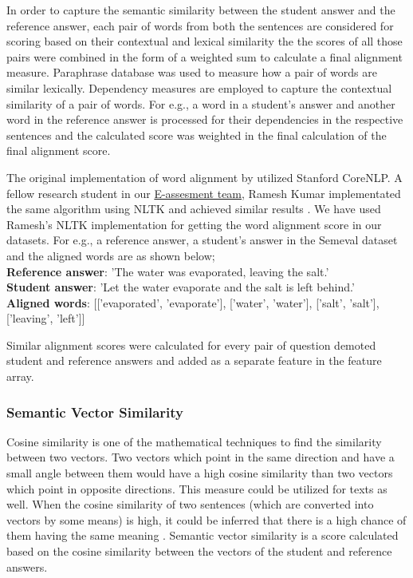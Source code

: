 	In order to capture the semantic similarity between the student answer and the reference answer, each pair of words from both the sentences are considered for scoring based on their contextual and lexical similarity the the scores of all those pairs were combined in the form of a weighted sum to calculate a final alignment measure. Paraphrase database \cite{ganitkevitch2013ppdb} was used to measure how a pair of words are similar lexically. Dependency measures are employed to capture the contextual similarity of a pair of words. For e.g., a word in a student's answer and another word in the reference answer is processed for their dependencies in the respective sentences and the calculated score was weighted in the final calculation of the final alignment score. 
	
	The original implementation of word alignment by \cite{sultan2014back} utilized Stanford CoreNLP. A fellow research student in our \href{https://digiklausur.github.io/}{E-assesment team}, Ramesh Kumar implementated the same algorithm using NLTK and achieved similar results \cite{ramesh2}. We have used Ramesh's NLTK implementation for getting the word alignment score in our datasets. For e.g., a reference answer, a student's answer in the Semeval dataset \cite{nielsen2008annotating} and the aligned words are as shown below; \\ 
	
	
	\noindent \textbf{Reference answer}: 'The water was evaporated, leaving the salt.' \\
	\textbf{Student answer}: 'Let the water evaporate and the salt is left behind.' \\
	\textbf{Aligned words}: [['evaporated', 'evaporate'], ['water', 'water'], ['salt', 'salt'], ['leaving', 'left']]    
	
	Similar alignment scores were calculated for every pair of question demoted student and reference answers and added as a separate feature in the feature array.	
	
	\subsubsection{Semantic Vector Similarity}
	Cosine similarity is one of the mathematical techniques to find the similarity between two vectors. Two vectors which point in the same direction and have a small angle between them would have a high cosine similarity than two vectors which point in opposite directions. This measure could be utilized for texts as well. When the cosine similarity of two sentences (which are converted into vectors by some means) is high, it could be inferred that there is a high chance of them having the same meaning \cite{cos_sim}. Semantic vector similarity is a score calculated based on the cosine similarity between the vectors of the student and reference answers.       
	
